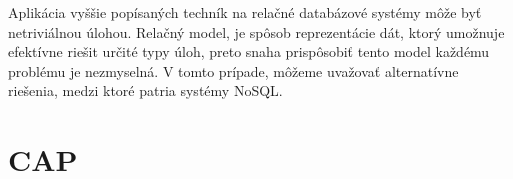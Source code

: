 \documentclass[11pt,twoside,a4paper]{book}
\begin{document}
Aplikácia vyššie popísaných techník na relačné databázové systémy môže byť netriviálnou úlohou. Relačný model, je spôsob reprezentácie dát, ktorý umožnuje efektívne riešit určité typy úloh, preto snaha prispôsobiť tento model každému problému je nezmyselná. V tomto prípade, môžeme uvažovať alternatívne riešenia, medzi ktoré patria systémy NoSQL.





% 



\section{CAP}
\label{section:CAP}

\end{document}
